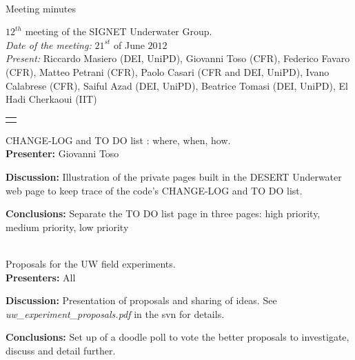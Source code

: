 \documentclass[11pt,journal,draftclsnofoot,onecolumn,twoside,letterpaper]{IEEEtran}
\theoremstyle{definition} \newtheorem{definition}[]{Definition}
\theoremstyle{theorem} \newtheorem{theorem}[]{Theorem}
\begin{document}
\pagestyle{empty}

\begin{Large} \\ \end{Large}
\begin{large} {Meeting minutes} \end{large}

\vspace{0.8cm}

 $12^{th}$ meeting of the SIGNET Underwater Group.\\
{\it Date of the meeting: } $21^{st}$ of June $2012$\\
{\it Present: } Riccardo Masiero (DEI, UniPD), Giovanni Toso (CFR), Federico Favaro (CFR), Matteo Petrani (CFR), Paolo Casari (CFR and DEI, UniPD), Ivano Calabrese (CFR), Saiful Azad (DEI, UniPD), Beatrice Tomasi (DEI, UniPD),  El Hadi Cherkaoui (IIT)\\

\vspace{0.5cm}

\begin{tabular}{p{}}
 \hline \\
\end{tabular}

 CHANGE-LOG and TO DO list : where, when, how.\\
{\bf Presenter:} Giovanni Toso

{\bf Discussion:} Illustration of the private pages built in the DESERT Underwater web page to keep trace of the code's CHANGE-LOG and TO DO list.

{\bf Conclusions:} Separate the TO DO list page in three pages: high priority, medium priority, low priority 

\ \\

 Proposals for the UW field experiments.\\
{\bf Presenters:} All

{\bf Discussion:} Presentation of proposals and sharing of ideas. See {\it uw\_experiment\_proposals.pdf} in the svn for details.

{\bf Conclusions:} Set up of a doodle poll to vote the better proposals to investigate, discuss and detail further.

\ \\
\end{document}
